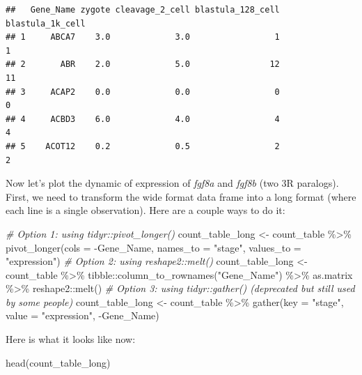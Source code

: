 \documentclass[
]{article}
\newenvironment{Shaded}{\begin{snugshade}}{\end{snugshade}}
\newcommand{\AttributeTok}[1]{\textcolor[rgb]{0.77,0.63,0.00}{#1}}
\newcommand{\CommentTok}[1]{\textcolor[rgb]{0.56,0.35,0.01}{\textit{#1}}}
\newcommand{\FunctionTok}[1]{\textcolor[rgb]{0.00,0.00,0.00}{#1}}
\newcommand{\NormalTok}[1]{#1}
\newcommand{\OtherTok}[1]{\textcolor[rgb]{0.56,0.35,0.01}{#1}}
\newcommand{\SpecialCharTok}[1]{\textcolor[rgb]{0.00,0.00,0.00}{#1}}
\newcommand{\StringTok}[1]{\textcolor[rgb]{0.31,0.60,0.02}{#1}}
\begin{document}
\begin{verbatim}
##   Gene_Name zygote cleavage_2_cell blastula_128_cell blastula_1k_cell
## 1     ABCA7    3.0             3.0                 1                1
## 2       ABR    2.0             5.0                12               11
## 3     ACAP2    0.0             0.0                 0                0
## 4     ACBD3    6.0             4.0                 4                4
## 5    ACOT12    0.2             0.5                 2                2
\end{verbatim}

Now let's plot the dynamic of expression of \emph{fgf8a} and
\emph{fgf8b} (two 3R paralogs). First, we need to transform the wide
format data frame into a long format (where each line is a single
observation). Here are a couple ways to do it:

\begin{Shaded}
\begin{Highlighting}[]
\CommentTok{\# Option 1: using tidyr::pivot\_longer()}
\NormalTok{count\_table\_long }\OtherTok{\textless{}{-}}\NormalTok{ count\_table }\SpecialCharTok{\%\textgreater{}\%} 
  \FunctionTok{pivot\_longer}\NormalTok{(}\AttributeTok{cols =} \SpecialCharTok{{-}}\NormalTok{Gene\_Name,}
               \AttributeTok{names\_to =} \StringTok{"stage"}\NormalTok{, }
               \AttributeTok{values\_to =} \StringTok{"expression"}\NormalTok{)}
\CommentTok{\# Option 2: using reshape2::melt()}
\NormalTok{count\_table\_long }\OtherTok{\textless{}{-}}\NormalTok{ count\_table }\SpecialCharTok{\%\textgreater{}\%} 
\NormalTok{  tibble}\SpecialCharTok{::}\FunctionTok{column\_to\_rownames}\NormalTok{(}\StringTok{"Gene\_Name"}\NormalTok{) }\SpecialCharTok{\%\textgreater{}\%} 
\NormalTok{  as.matrix }\SpecialCharTok{\%\textgreater{}\%} 
\NormalTok{  reshape2}\SpecialCharTok{::}\FunctionTok{melt}\NormalTok{()}
\CommentTok{\# Option 3: using tidyr::gather() (deprecated but still used by some people)}
\NormalTok{count\_table\_long }\OtherTok{\textless{}{-}}\NormalTok{ count\_table }\SpecialCharTok{\%\textgreater{}\%} 
  \FunctionTok{gather}\NormalTok{(}\AttributeTok{key =} \StringTok{"stage"}\NormalTok{, }
         \AttributeTok{value =} \StringTok{"expression"}\NormalTok{, }
         \SpecialCharTok{{-}}\NormalTok{Gene\_Name)}
\end{Highlighting}
\end{Shaded}

Here is what it looks like now:

\begin{Shaded}
\begin{Highlighting}[]
\FunctionTok{head}\NormalTok{(count\_table\_long)}
\end{Highlighting}
\end{Shaded}
\end{document}
